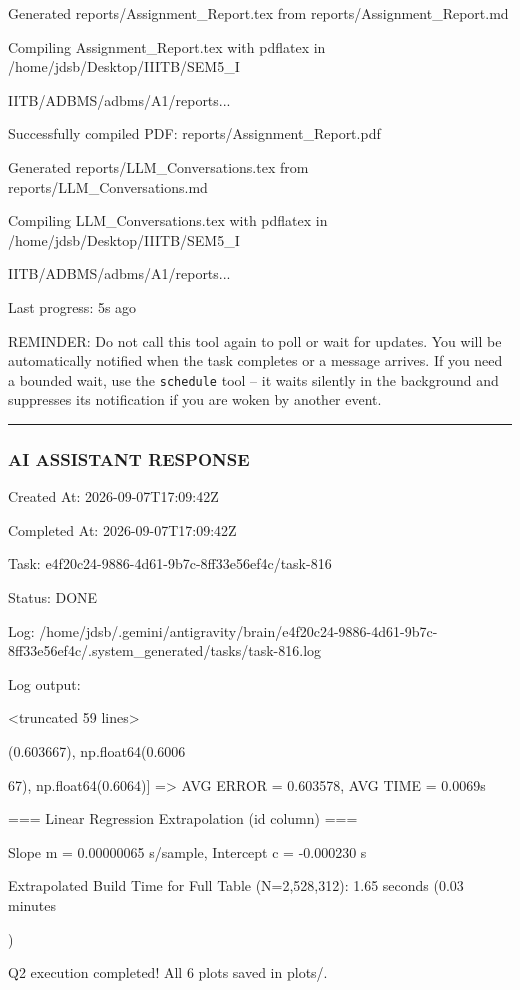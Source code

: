 \documentclass[11pt,a4paper]{article}
\begin{document}
Generated reports/Assignment\_Report.tex from reports/Assignment\_Report.md

Compiling Assignment\_Report.tex with pdflatex in /home/jdsb/Desktop/IIITB/SEM5\_I

IITB/ADBMS/adbms/A1/reports...

Successfully compiled PDF: reports/Assignment\_Report.pdf

Generated reports/LLM\_Conversations.tex from reports/LLM\_Conversations.md

Compiling LLM\_Conversations.tex with pdflatex in /home/jdsb/Desktop/IIITB/SEM5\_I

IITB/ADBMS/adbms/A1/reports...


Last progress: 5s ago



REMINDER: Do not call this tool again to poll or wait for updates. You will be automatically notified when the task completes or a message arrives. If you need a bounded wait, use the \texttt{schedule} tool -- it waits silently in the background and suppresses its notification if you are woken by another event.


\hrule

\subsubsection{AI ASSISTANT RESPONSE}

Created At: 2026-09-07T17:09:42Z

Completed At: 2026-09-07T17:09:42Z

Task: e4f20c24-9886-4d61-9b7c-8ff33e56ef4c/task-816

Status: DONE

Log: /home/jdsb/.gemini/antigravity/brain/e4f20c24-9886-4d61-9b7c-8ff33e56ef4c/.system\_generated/tasks/task-816.log

Log output:

<truncated 59 lines>

(0.603667), np.float64(0.6006

67), np.float64(0.6064)] => AVG ERROR = 0.603578, AVG TIME = 0.0069s

=== Linear Regression Extrapolation (id column) ===

Slope m = 0.00000065 s/sample, Intercept c = -0.000230 s

Extrapolated Build Time for Full Table (N=2,528,312): 1.65 seconds (0.03 minutes

)

Q2 execution completed! All 6 plots saved in plots/.
\end{document}
